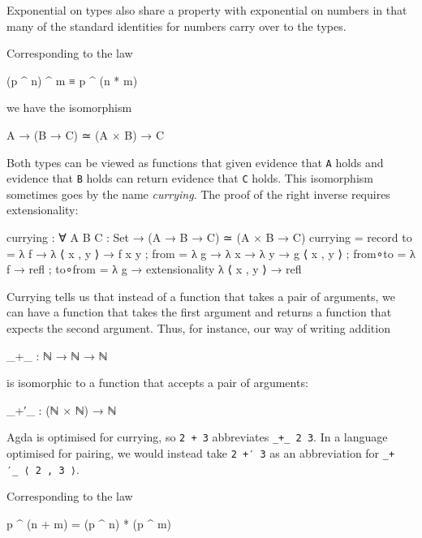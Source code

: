 Exponential on types also share a property with exponential on numbers
in that many of the standard identities for numbers carry over to the
types.

Corresponding to the law

\begin{myDisplay}
(p ^ n) ^ m  ≡  p ^ (n * m)
\end{myDisplay}

we have the isomorphism

\begin{myDisplay}
A → (B → C)  ≃  (A × B) → C
\end{myDisplay}

Both types can be viewed as functions that given evidence that
\texttt{A} holds and evidence that \texttt{B} holds can return evidence
that \texttt{C} holds. This isomorphism sometimes goes by the name
\emph{currying}. The proof of the right inverse requires extensionality:

\begin{fence}
\begin{code}
currying : ∀ {A B C : Set} → (A → B → C) ≃ (A × B → C)
currying =
  record
    { to      =  λ{ f → λ{ ⟨ x , y ⟩ → f x y }}
    ; from    =  λ{ g → λ{ x → λ{ y → g ⟨ x , y ⟩ }}}
    ; from∘to =  λ{ f → refl }
    ; to∘from =  λ{ g → extensionality λ{ ⟨ x , y ⟩ → refl }}
    }
\end{code}
\end{fence}

Currying tells us that instead of a function that takes a pair of
arguments, we can have a function that takes the first argument and
returns a function that expects the second argument. Thus, for instance,
our way of writing addition

\begin{myDisplay}
_+_ : ℕ → ℕ → ℕ
\end{myDisplay}

is isomorphic to a function that accepts a pair of arguments:

\begin{myDisplay}
_+′_ : (ℕ × ℕ) → ℕ
\end{myDisplay}

Agda is optimised for currying, so \texttt{2\ +\ 3} abbreviates
\texttt{\_+\_\ 2\ 3}. In a language optimised for pairing, we would
instead take \texttt{2\ +′\ 3} as an abbreviation for
\texttt{\_+′\_\ ⟨\ 2\ ,\ 3\ ⟩}.

Corresponding to the law

\begin{myDisplay}
p ^ (n + m) = (p ^ n) * (p ^ m)
\end{myDisplay}

